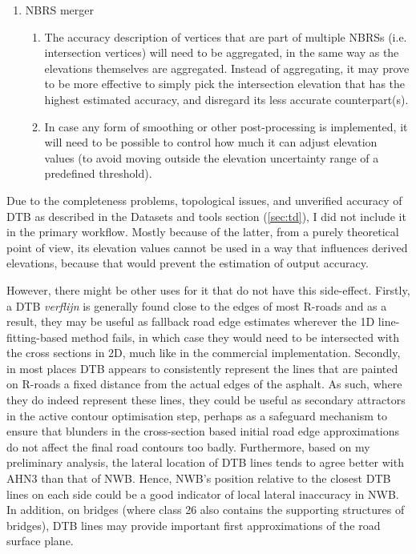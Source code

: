 \begin{enumerate}
\begin{enumerate}
    \end{enumerate}
    \item NBRS merger
    \begin{enumerate}
        \item The accuracy description of vertices that are part of multiple NBRSs (i.e. intersection vertices) will need to be aggregated, in the same way as the elevations themselves are aggregated. Instead of aggregating, it may prove to be more effective to simply pick the intersection elevation that has the highest estimated accuracy, and disregard its less accurate counterpart(s).
        \item In case any form of smoothing or other post-processing is implemented, it will need to be possible to control how much it can adjust elevation values (to avoid moving outside the elevation uncertainty range of a predefined threshold).
    \end{enumerate}
\end{enumerate}

Due to the completeness problems, topological issues, and unverified accuracy of DTB as described in the Datasets and tools section (\ref{sec:td}), I did not include it in the primary workflow. Mostly because of the latter, from a purely theoretical point of view, its elevation values cannot be used in a way that influences derived elevations, because that would prevent the estimation of output accuracy. 

However, there might be other uses for it that do not have this side-effect. Firstly, a DTB \textit{verflijn} is generally found close to the edges of most R-roads and as a result, they may be useful as fallback road edge estimates wherever the 1D line-fitting-based method fails, in which case they would need to be intersected with the cross sections in 2D, much like in the commercial implementation. Secondly, in most places DTB appears to consistently represent the lines that are painted on R-roads a fixed distance from the actual edges of the asphalt. As such, where they do indeed represent these lines, they could be useful as secondary attractors in the active contour optimisation step, perhaps as a safeguard mechanism to ensure that blunders in the cross-section based initial road edge approximations do not affect the final road contours too badly. Furthermore, based on my preliminary analysis, the lateral location of DTB lines tends to agree better with AHN3 than that of NWB. Hence, NWB’s position relative to the closest DTB lines on each side could be a good indicator of local lateral inaccuracy in NWB. In addition, on bridges (where class 26 also contains the supporting structures of bridges), DTB lines may provide important first approximations of the road surface plane.

